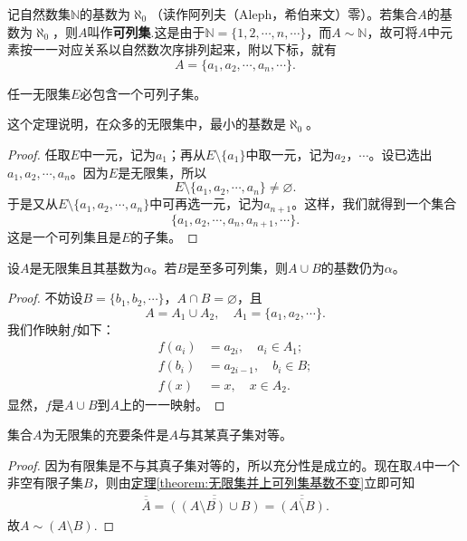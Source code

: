 \documentclass[lang=cn,newtx,10pt,scheme=chinese]{../Template/elegantbook}
\begin{document}
\begin{definition}\label{definition:自然数集的基数·可列集}
记自然数集\(\mathbb{N}\)的基数为\(\aleph_0\)（读作阿列夫（Aleph，希伯来文）零）。若集合\(A\)的基数为\(\aleph_0\)，则\(A\)叫作\textbf{可列集}.这是由于\(\mathbb{N}=\{1,2,\cdots,n,\cdots\}\)，而\(A\sim\mathbb{N}\)，故可将\(A\)中元素按一一对应关系以自然数次序排列起来，附以下标，就有
\[A = \{a_1,a_2,\cdots,a_n,\cdots\}.\]
\end{definition}

\begin{theorem}\label{theorem:任一无限集必包含一个可列子集}
任一无限集\(E\)必包含一个可列子集。
\end{theorem}
\begin{note}
  这个定理说明，在众多的无限集中，最小的基数是\(\aleph_0\)。
\end{note}
\begin{proof}
  任取\(E\)中一元，记为\(a_1\)；再从\(E\setminus\{a_1\}\)中取一元，记为\(a_2\)，\(\cdots\)。设已选出\(a_1,a_2,\cdots,a_n\)。因为\(E\)是无限集，所以
\[E\setminus\{a_1,a_2,\cdots,a_n\} \neq \varnothing.\]
于是又从\(E\setminus\{a_1,a_2,\cdots,a_n\}\)中可再选一元，记为\(a_{n + 1}\)。这样，我们就得到一个集合
\[\{a_1,a_2,\cdots,a_n,a_{n + 1},\cdots\}.\]
这是一个可列集且是\(E\)的子集。
\end{proof}

\begin{theorem}\label{theorem:无限集并上可列集基数不变}
设\(A\)是无限集且其基数为\(\alpha\)。若\(B\)是至多可列集，则\(A\cup B\)的基数仍为\(\alpha\)。
\end{theorem}
\begin{proof}
  不妨设\(B = \{b_1,b_2,\cdots\}\)，\(A\cap B=\varnothing\)，且
\[A = A_1\cup A_2, \quad A_1 = \{a_1,a_2,\cdots\}.\]
我们作映射\(f\)如下：
\begin{align*}
f(a_i)&=a_{2i}, \quad a_i\in A_1;\\
f(b_i)&=a_{2i - 1}, \quad b_i\in B;\\
f(x)&=x, \quad x\in A_2.
\end{align*}
显然，\(f\)是\(A\cup B\)到\(A\)上的一一映射。
\end{proof}

\begin{theorem}\label{theorem:无限集的充要条件}
集合\(A\)为无限集的充要条件是\(A\)与其某真子集对等。
\end{theorem}
\begin{proof}
因为有限集是不与其真子集对等的，所以充分性是成立的。现在取\(A\)中一个非空有限子集\(B\)，则由\hyperref[theorem:无限集并上可列集基数不变]{定理\ref{theorem:无限集并上可列集基数不变}}立即可知
\begin{align*}
  \overline{\overline{A}}=\overline{\overline{\left( \left( A\setminus B \right) \cup B \right) }}=\overline{\overline{\left( A\setminus B \right) }}.
\end{align*}
故$A\sim \left( A\setminus B \right) $.
\end{proof}
\end{document}
